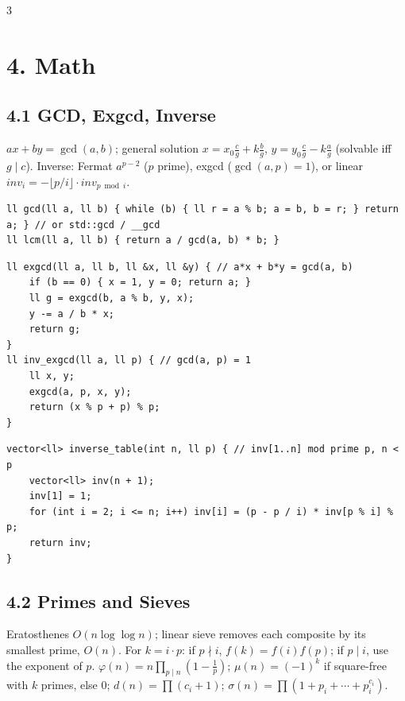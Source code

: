 \documentclass[8pt]{extarticle}
\begin{document}
\begin{multicols*}{3}
\section*{4. Math}

\subsection*{4.1 GCD, Exgcd, Inverse}

$ax + by = \gcd(a, b)$; general solution $x = x_0 \frac{c}{g} + k\frac{b}{g}$, $y = y_0 \frac{c}{g} - k \frac{a}{g}$ (solvable iff $g \mid c$). Inverse: Fermat $a^{p-2}$ ($p$ prime), exgcd ($\gcd(a, p) = 1$), or linear $inv_i = -\lfloor p/i \rfloor \cdot inv_{p \bmod i}$.

\begin{lstlisting}
ll gcd(ll a, ll b) { while (b) { ll r = a % b; a = b, b = r; } return a; } // or std::gcd / __gcd
ll lcm(ll a, ll b) { return a / gcd(a, b) * b; }
\end{lstlisting}

\begin{lstlisting}
ll exgcd(ll a, ll b, ll &x, ll &y) { // a*x + b*y = gcd(a, b)
    if (b == 0) { x = 1, y = 0; return a; }
    ll g = exgcd(b, a % b, y, x);
    y -= a / b * x;
    return g;
}
ll inv_exgcd(ll a, ll p) { // gcd(a, p) = 1
    ll x, y;
    exgcd(a, p, x, y);
    return (x % p + p) % p;
}
\end{lstlisting}

\begin{lstlisting}
vector<ll> inverse_table(int n, ll p) { // inv[1..n] mod prime p, n < p
    vector<ll> inv(n + 1);
    inv[1] = 1;
    for (int i = 2; i <= n; i++) inv[i] = (p - p / i) * inv[p % i] % p;
    return inv;
}
\end{lstlisting}

\subsection*{4.2 Primes and Sieves}

Eratosthenes $O(n \log\log n)$; linear sieve removes each composite by its smallest prime, $O(n)$. For $k = i \cdot p$: if $p \nmid i$, $f(k) = f(i) f(p)$; if $p \mid i$, use the exponent of $p$.
$\varphi(n) = n \prod_{p \mid n}(1 - \frac1p)$; $\mu(n) = (-1)^k$ if square-free with $k$ primes, else $0$; $d(n) = \prod (c_i + 1)$; $\sigma(n) = \prod (1 + p_i + \cdots + p_i^{c_i})$.


\end{multicols*}
\end{document}
